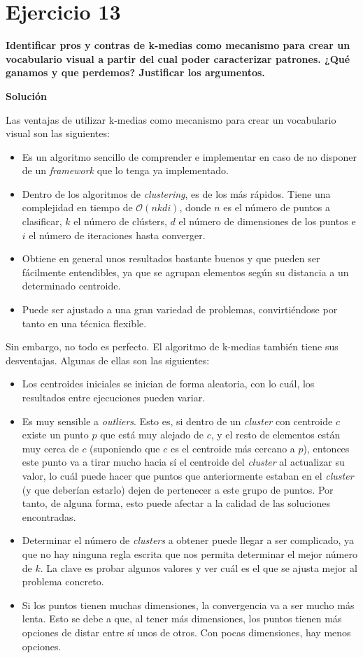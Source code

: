 \documentclass[11pt,a4paper]{article}
\newcommand{\answer}{\noindent\textbf{Solución}}
\newcommand{\question}[1]{\noindent\textbf{#1}}
\newcommand{\nonumbersection}[1]{\section*{#1}\addcontentsline{toc}{section}{#1}}
\begin{document}
\nonumbersection{Ejercicio 13}

\question{Identificar pros y contras de k-medias como mecanismo para crear un
vocabulario visual a partir del cual poder caracterizar patrones. ¿Qué
ganamos y que perdemos? Justificar los argumentos.}

\answer

Las ventajas de utilizar k-medias como mecanismo para crear un vocabulario visual son las siguientes:

\begin{itemize}
	\item Es un algoritmo sencillo de comprender e implementar en caso de no disponer de un \textit{framework} que lo tenga
	ya implementado.
	\item Dentro de los algoritmos de \textit{clustering}, es de los más rápidos. Tiene una complejidad en tiempo de
	$\mathcal{O}(nkdi)$, donde $n$ es el número de puntos a clasificar, $k$ el número de clústers, $d$ el número de
	dimensiones de los puntos e $i$ el número de iteraciones hasta converger.
	\item Obtiene en general unos resultados bastante buenos y que pueden ser fácilmente entendibles, ya que se agrupan
	elementos según su distancia a un determinado centroide.
	\item Puede ser ajustado a una gran variedad de problemas, convirtiéndose por tanto en una técnica flexible.
\end{itemize}

Sin embargo, no todo es perfecto. El algoritmo de k-medias también tiene sus desventajas. Algunas de ellas son las siguientes:

\begin{itemize}
	\item Los centroides iniciales se inician de forma aleatoria, con lo cuál, los resultados entre ejecuciones pueden variar.
	\item Es muy sensible a \textit{outliers}. Esto es, si dentro de un \textit{cluster} con centroide $c$ existe un punto $p$
	que está muy alejado de $c$, y el resto de elementos están muy cerca de $c$ (suponiendo que $c$ es el centroide más cercano
	a $p$), entonces este punto va a tirar mucho hacia sí el centroide del \textit{cluster} al actualizar su valor, lo cuál
	puede hacer que puntos que anteriormente estaban en el \textit{cluster} (y que deberían estarlo) dejen de pertenecer a
	este grupo de puntos. Por tanto, de alguna forma, esto puede afectar a la calidad de las soluciones encontradas.
	\item Determinar el número de \textit{clusters} a obtener puede llegar a ser complicado, ya que no hay ninguna regla escrita
	que nos permita determinar el mejor número de $k$. La clave es probar algunos valores y ver cuál es el que se ajusta
	mejor al problema concreto.
	\item Si los puntos tienen muchas dimensiones, la convergencia va a ser mucho más lenta. Esto se debe a que, al tener más
	dimensiones, los puntos tienen más opciones de distar entre sí unos de otros. Con pocas dimensiones, hay menos opciones.
\end{itemize}
\end{document}
